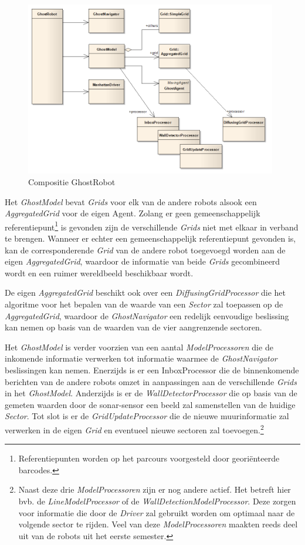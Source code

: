 \documentclass[12pt,a4paper]{report}
\begin{document}
\begin{figure}[htbp]
  \centering
  \includegraphics[width=110mm]{resources/ghostrobot.png}
  \caption{Compositie GhostRobot}
  \label{uml:ghostrobot}
\end{figure}

Het \emph{GhostModel} bevat \emph{Grids} voor elk van de andere robots alsook een \emph{AggregatedGrid} voor de eigen Agent. Zolang er geen gemeenschappelijk referentiepunt\footnote{Referentiepunten worden op het parcours voorgesteld door geori\"enteerde barcodes.} is gevonden zijn de verschillende \emph{Grids} niet met elkaar in verband te brengen. Wanneer er echter een gemeenschappelijk referentiepunt gevonden is, kan de corresponderende \emph{Grid} van de andere robot toegevoegd worden aan de eigen \emph{AggregatedGrid}, waardoor de informatie van beide \emph{Grids} gecombineerd wordt en een ruimer wereldbeeld beschikbaar wordt.

De eigen \emph{AggregatedGrid} beschikt ook over een \emph{DiffusingGridProcessor} die het algoritme voor het bepalen van de waarde van een \emph{Sector} zal toepassen op de \emph{AggregatedGrid}, waardoor de \emph{GhostNavigator} een redelijk eenvoudige beslissing kan nemen op basis van de waarden van de vier aangrenzende sectoren.

Het \emph{GhostModel} is verder voorzien van een aantal \emph{ModelProcessoren} die de inkomende informatie verwerken tot informatie waarmee de \emph{GhostNavigator} beslissingen kan nemen. Enerzijds is er een InboxProcessor die de binnenkomende berichten van de andere robots omzet in aanpassingen aan de verschillende \emph{Grids} in het \emph{GhostModel}. Anderzijds is er de \emph{WallDetectorProcessor} die op basis van de gemeten waarden door de sonar-sensor een beeld zal samenstellen van de huidige \emph{Sector}. Tot slot is er de \emph{GridUpdateProcessor} die de nieuwe muurinformatie zal verwerken in de eigen \emph{Grid} en eventueel nieuwe sectoren zal toevoegen.\footnote{Naast deze drie \emph{ModelProcessoren} zijn er nog andere actief. Het betreft hier bvb. de \emph{LineModelProcessor} of de \emph{WallDetectionModelProcessor}. Deze zorgen voor informatie die door de \emph{Driver} zal gebruikt worden om optimaal naar de volgende sector te rijden. Veel van deze \emph{ModelProcessoren} maakten reeds deel uit van de robots uit het eerste semester.}
\end{document}
